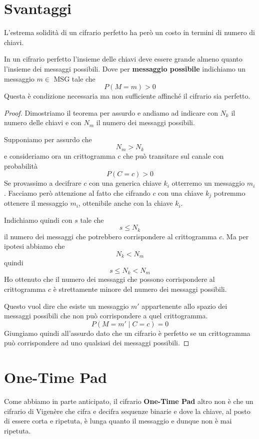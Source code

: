 \section{Svantaggi}\label{svantaggi_perfetti}
L'estrema solidit\`a di un cifrario perfetto ha per\`o un costo in termini di numero di chiavi.

\begin{theorem}[Shannon]
	In un cifrario perfetto l'insieme delle chiavi deve essere grande almeno quanto l'insieme dei messaggi possibili.
	Dove per \textbf{messaggio possibile} indichiamo un messaggio $m \in$ MSG tale che
	\[ P(M = m) > 0 \]
	Questa \`e condizione necessaria ma non sufficiente affinch\'e il cifrario sia perfetto.
	\begin{proof}
		Dimostriamo il teorema per assurdo e andiamo ad indicare con $N_k$ il numero delle chiavi e con $N_m$ il numero
		dei messaggi possibili.

		Supponiamo per assurdo che
		\[ N_m > N_k \]
		e consideriamo ora un crittogramma $c$ che pu\`o transitare sul canale con probabilit\`a
		\[ P(C = c) > 0 \]
		Se provassimo a decifrare $c$ con una generica chiave $k_i$ otterremo un messaggio $m_i$. Facciamo per\`o
		attenzione al fatto che cifrando $c$ con una chiave $k_j$ potremmo ottenere il messaggio $m_i$, ottenibile anche
		con la chiave $k_i$.

		Indichiamo quindi con $s$ tale che
		\[ s \leq N_k \]
		il numero dei messaggi che potrebbero corrispondere al crittogramma $c$. Ma per ipotesi abbiamo che
		\[ N_k < N_m \]
		quindi
		\[ s \leq N_k < N_m \]
		Ho ottenuto che il numero dei messaggi che possono corrispondere al crittogramma $c$ \`e strettamente minore
		del numero dei messaggi possibili.

		Questo vuol dire che esiste un messaggio $m'$ appartenente allo spazio dei messaggi possibili che non pu\`o
		corrispondere a quel crittogramma.
		\[ P(M = m' \mid C = c) = 0 \]
		Giungiamo quindi all'assurdo dato che un cifrario \`e perfetto se un crittogramma pu\`o corrispondere ad uno
		qualsiasi dei messaggi possibili.
	\end{proof}
\end{theorem}

\section{One-Time Pad}\label{one_time_pad}
Come abbiamo in parte anticipato, il cifrario \textbf{One-Time Pad} altro non \`e che un cifrario di Vigen\`ere che
cifra e decifra sequenze binarie e dove la chiave, al posto di essere corta e ripetuta, \`e lunga quanto il messaggio
e dunque non \`e mai ripetuta.

